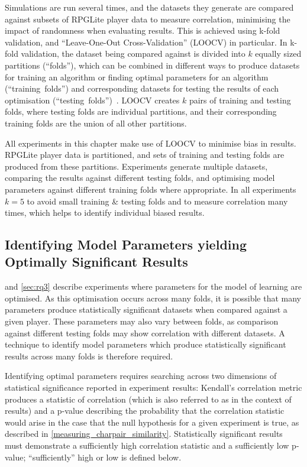 Simulations are run several times, and the datasets they generate are compared
against subsets of RPGLite player data to measure correlation, minimising the
impact of randomness when evaluating results. This is achieved using k-fold
validation, and ``Leave-One-Out Cross-Validation'' (LOOCV) in particular. In
k-fold validation, the dataset being compared against is divided into $k$
equally sized partitions (``folds''), which can be combined in different ways to
produce datasets for training an algorithm or finding optimal parameters for an
algorithm (``training~folds'') and corresponding datasets for testing the
results of each optimisation
(``testing~folds'')~\cite{k-fold-validation-definition}. LOOCV creates $k$ pairs
of training and testing folds, where testing folds are individual partitions,
and their corresponding training folds are the union of all other partitions.

All experiments in this chapter make use of LOOCV to minimise bias in results.
RPGLite player data is partitioned, and sets of training and testing folds are
produced from these partitions. Experiments generate multiple datasets,
comparing the results against different testing folds, and optimising model
parameters against different training folds where appropriate. In all
experiments \(k = 5\) to avoid small training \& testing folds and to measure
correlation many times, which helps to identify individual biased results.


\subsection{Identifying Model Parameters yielding Optimally Significant Results}
\label{identifying-significant-results-explanation}

 and \cref{sec:rq3} describe experiments where parameters for the
model of learning are optimised. As this optimisation occurs across many folds,
it is possible that many parameters produce statistically significant datasets
when compared against a given player. These parameters may also vary between
folds, as comparison against different testing folds may show correlation with
different datasets. A technique to identify model parameters which produce
statistically significant results across many folds is therefore required.

Identifying optimal parameters requires searching across two dimensions of
statistical significance reported in experiment results: Kendall's \tau{}
correlation metric produces a statistic of correlation (which is also referred
to as \tau{} in the context of results) and a p-value describing the probability
that the correlation statistic would arise in the case that the null hypothesis
for a given experiment is true, as described in
\cref{measuring_charpair_similarity}. Statistically significant results must
demonstrate a sufficiently high correlation statistic and a sufficiently low
p-value; ``sufficiently'' high or low is defined below.


